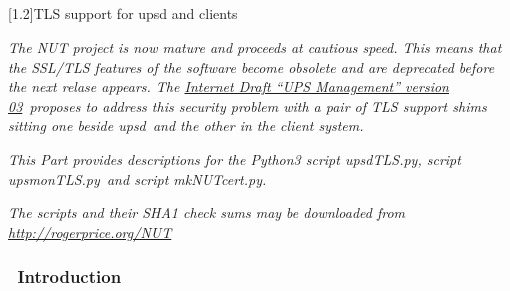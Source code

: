 \documentclass[12pt]{article}
\newlength{\headersep}\setlength{\headersep}{3mm}
\newcommand{\Hsep}{\hspace{\headersep}}
\newcommand{\newcolumn}{\vfill\eject}
\newcommand{\upsd}{\mbox{\textcolor{UPSDCOLOUR}{upsd}}}
\newcommand{\mkNUTcert}{\mbox{\textcolor{MKNUTCERTCOLOUR}{mkNUTcert.py}}}
\newcommand{\upsdTLS}{\mbox{\textcolor{UPSDCOLOUR}{upsdTLS.py}}}
\newcommand{\upsmonTLS}{\mbox{\textcolor{UPSMONCOLOUR}{upsmonTLS.py}}}
\newcommand{\RFC}{\href{https://tools.ietf.org/id/draft-rprice-ups-management-protocol-03.html}%
                       {Internet Draft ``UPS Management'' version 03}}
\begin{document}
\begin{center}
\end{center}

\vspace*{\fill}



\clearpage
\setcounter{section}{19}
\begin{center}
\part[\hspace{\fill}\textsf{TLS support for \upsd\ and clients}\hspace{\fill}]{}\label{part:shim}
\vspace{10mm}
\scalebox{1.0}[1.2]{\textsf{\Huge{TLS support for upsd and clients}}}
\vspace{10mm}
\end{center}

\textit{The NUT project is now mature and proceeds at cautious speed.  This
  means that the SSL/TLS features of the software become obsolete and are
  deprecated before the next relase appears.  The \RFC\ proposes to address
  this security problem with a pair of TLS support shims sitting one beside
  \upsd\ and the other in the client system.}

\textit{This Part provides descriptions for the Python3 script \upsdTLS,
  script \upsmonTLS\ and script \mkNUTcert.}

\textit{The scripts and their SHA1 check sums may be downloaded from
        \href{rogerprice.org/NUT}{http://rogerprice.org/NUT}}

\vspace{10mm}

\section{\Hsep\ Introduction}\label{section:pyIntro}
\end{document}
